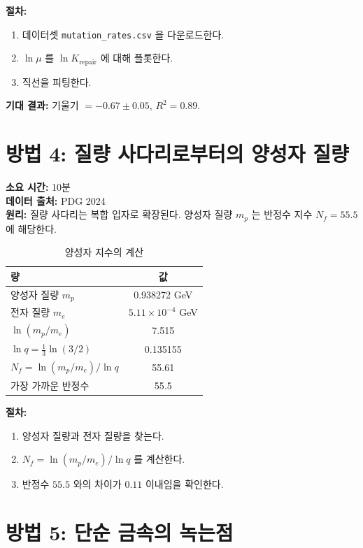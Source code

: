 \documentclass[12pt,a4paper]{article}
\begin{document}
	\textbf{절차:}
	\begin{enumerate}[label=(\arabic*)]
		\item 데이터셋 \texttt{mutation\_rates.csv} 을 다운로드한다.
		\item \(\ln \mu\) 를 \(\ln K_{\text{repair}}\) 에 대해 플롯한다.
		\item 직선을 피팅한다.
	\end{enumerate}
	
	\textbf{기대 결과:} 기울기 \(= -0.67 \pm 0.05\), \(R^2 = 0.89\).
	
	\section{방법 4: 질량 사다리로부터의 양성자 질량}
	\label{sec:proton}
	
	\textbf{소요 시간:} 10분\\
	\textbf{데이터 출처:} PDG 2024 \cite{PDG2024}\\
	\textbf{원리:} 질량 사다리는 복합 입자로 확장된다. 양성자 질량 \(m_p\) 는 반정수 지수 \(N_f = 55.5\) 에 해당한다.
	
	\begin{table}[H]
		\centering
		\caption{양성자 지수의 계산}
		\label{tab:proton}
		\begin{tabular}{l c}
			\toprule
			량 & 값 \\
			\midrule
			양성자 질량 \(m_p\) & 0.938272 GeV \\
			전자 질량 \(m_e\) & \(5.11\times10^{-4}\) GeV \\
			\(\ln(m_p/m_e)\) & 7.515 \\
			\(\ln q = \frac{1}{3}\ln(3/2)\) & 0.135155 \\
			\(N_f = \ln(m_p/m_e)/\ln q\) & 55.61 \\
			가장 가까운 반정수 & 55.5 \\
			\bottomrule
		\end{tabular}
	\end{table}
	
	\textbf{절차:}
	\begin{enumerate}[label=(\arabic*)]
		\item 양성자 질량과 전자 질량을 찾는다.
		\item \(N_f = \ln(m_p / m_e) / \ln q\) 를 계산한다.
		\item 반정수 \(55.5\) 와의 차이가 \(0.11\) 이내임을 확인한다.
	\end{enumerate}
	
	\section{방법 5: 단순 금속의 녹는점}
	\label{sec:melting}
	
\end{document}
